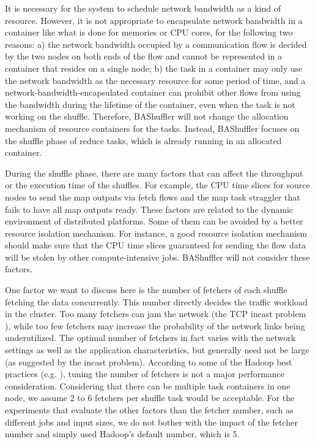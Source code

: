 \documentclass[10pt,journal,compsoc]{IEEEtran}
\begin{document}
It is necessary for the system to schedule network bandwidth as a
kind of resource.
However, it is not appropriate to encapsulate network bandwidth
in a container
like what is done for memories or CPU cores, for the following two reasons: 
a) the network bandwidth occupied by a communication flow is decided
by the two nodes on both ends of the flow
and cannot be represented in a container that resides on a single node; 
b) the task in a container may only use the network bandwidth as the
necessary resource for some period of time,
and a network-bandwidth-encapsulated container can prohibit other 
flows from using the bandwidth 
during the lifetime of the container, even when the task is not working on the shuffle.
Therefore, BAShuffler will not change the allocation mechanism of
resource containers for the tasks.
Instead, BAShuffler focuses on the shuffle phase of reduce tasks,
which is already running in an allocated container.

During the shuffle phase, there are many factors that can
affect the throughput or the execution time of the shuffles.
For example, the CPU time slices for source nodes to send the map outputs via fetch flows and 
the map task straggler that fails to have all map outputs ready. 
These factors are related to the dynamic environment of distributed platforms. 
Some of them can be avoided by a better resource isolation mechanism. 
For instance, a good resource isolation mechanism should make sure that the CPU time slices guaranteed for
sending the flow data will be stolen by other compute-intensive jobs.
BAShuffler will not consider these factors.


One factor we want to discuss here is the number of fetchers of each shuffle fetching the data
concurrently.
This number directly decides the traffic workload in the cluster. Too many
fetchers can jam the network (the TCP incast problem \cite{Phanishayee:2008:MAT}),
while too few fetchers may increase the probability of the network
links being underutilized. 
The optimal number of fetchers in fact varies with the network settings as well as the application characteristics, but generally need not be large (as suggested by the incast problem). 
According to some of the Hadoop best practices (e.g. \cite{white2015hadoop}), tuning the number of fetchers is not a major performance consideration. 
Considering that there can be multiple task containers in one node, we assume 2 to 6 fetchers per shuffle task would be acceptable. 
For the experiments that evaluate the other factors than the fetcher number, such as different jobs and input sizes, we do not bother with the impact of the fetcher number and simply used Hadoop's default number, which is 5. 
\end{document}
